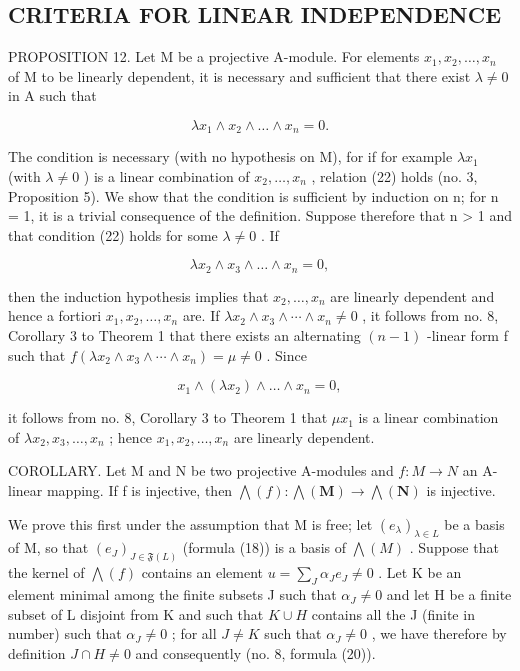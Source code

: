 \subsection{CRITERIA FOR LINEAR INDEPENDENCE}

PROPOSITION 12. Let M be a projective A-module. For elements \(x_1, x_2, \ldots, x_n\) of M to be linearly dependent, it is necessary and sufficient that there exist \(\lambda \neq 0\) in A such that

\[
\lambda x _ {1} \wedge x _ {2} \wedge \dots \wedge x _ {n} = 0.\tag{22}
\]

The condition is necessary (with no hypothesis on M), for if for example \(\lambda x_{1}\) (with \(\lambda \neq 0\) ) is a linear combination of \(x_{2}, \ldots, x_{n}\) , relation (22) holds (no. 3, Proposition 5). We show that the condition is sufficient by induction on n; for n = 1, it is a trivial consequence of the definition. Suppose therefore that n \textgreater{} 1 and that condition (22) holds for some \(\lambda \neq 0\) . If

\[
\lambda x _ {2} \wedge x _ {3} \wedge \dots \wedge x _ {n} = 0,
\]

then the induction hypothesis implies that \(x_{2},\ldots,x_{n}\) are linearly dependent and hence a fortiori \(x_{1},x_{2},\ldots,x_{n}\) are. If \(\lambda x_{2}\wedge x_{3}\wedge\cdots\wedge x_{n}\neq0\) , it follows from no. 8, Corollary 3 to Theorem 1 that there exists an alternating \((n-1)\) -linear form f such that \(f(\lambda x_{2}\wedge x_{3}\wedge\cdots\wedge x_{n})=\mu\neq0\) . Since

\[
x _ {1} \wedge (\lambda x _ {2}) \wedge \dots \wedge x _ {n} = 0,
\]

it follows from no. 8, Corollary 3 to Theorem 1 that \(\mu x_{1}\) is a linear combination of \(\lambda x_{2}, x_{3}, \ldots, x_{n}\) ; hence \(x_{1}, x_{2}, \ldots, x_{n}\) are linearly dependent.

COROLLARY. Let M and N be two projective A-modules and \(f:M\to N\) an A-linear mapping. If f is injective, then \(\bigwedge(f):\bigwedge(\mathbf{M})\to\bigwedge(\mathbf{N})\) is injective.

We prove this first under the assumption that M is free; let \((e_{\lambda})_{\lambda \in L}\) be a basis of M, so that \((e_{J})_{J \in \mathfrak{F}(L)}\) (formula (18)) is a basis of \(\bigwedge(M)\) . Suppose that the kernel of \(\bigwedge(f)\) contains an element \(u = \sum_{J} \alpha_{J} e_{J} \neq 0\) . Let K be an element minimal among the finite subsets J such that \(\alpha_{J} \neq 0\) and let H be a finite subset of L disjoint from K and such that \(K \cup H\) contains all the J (finite in number) such that \(\alpha_{J} \neq 0\) ; for all \(J \neq K\) such that \(\alpha_{J} \neq 0\) , we have therefore by definition \(J \cap H \neq 0\) and consequently (no. 8, formula (20)).

